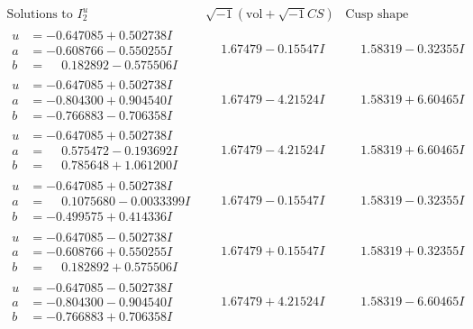 \documentclass[1p]{elsarticle_modified}
\theoremstyle{definition}
\newcommand{\I}{\sqrt{-1}}
\begin{document}
$$\begin{array}{c|c|c}  
\text{Solutions to }I^u_{2}& \I (\text{vol} + \sqrt{-1}CS) & \text{Cusp shape}\\
 \hline 
\begin{aligned}
u &= -0.647085 + 0.502738 I \\
a &= -0.608766 - 0.550255 I \\
b &= \phantom{-}0.182892 - 0.575506 I\end{aligned}
 & \phantom{-}1.67479 - 0.15547 I & \phantom{-}1.58319 - 0.32355 I \\ \hline\begin{aligned}
u &= -0.647085 + 0.502738 I \\
a &= -0.804300 + 0.904540 I \\
b &= -0.766883 - 0.706358 I\end{aligned}
 & \phantom{-}1.67479 - 4.21524 I & \phantom{-}1.58319 + 6.60465 I \\ \hline\begin{aligned}
u &= -0.647085 + 0.502738 I \\
a &= \phantom{-}0.575472 - 0.193692 I \\
b &= \phantom{-}0.785648 + 1.061200 I\end{aligned}
 & \phantom{-}1.67479 - 4.21524 I & \phantom{-}1.58319 + 6.60465 I \\ \hline\begin{aligned}
u &= -0.647085 + 0.502738 I \\
a &= \phantom{-}0.1075680 - 0.0033399 I \\
b &= -0.499575 + 0.414336 I\end{aligned}
 & \phantom{-}1.67479 - 0.15547 I & \phantom{-}1.58319 - 0.32355 I \\ \hline\begin{aligned}
u &= -0.647085 - 0.502738 I \\
a &= -0.608766 + 0.550255 I \\
b &= \phantom{-}0.182892 + 0.575506 I\end{aligned}
 & \phantom{-}1.67479 + 0.15547 I & \phantom{-}1.58319 + 0.32355 I \\ \hline\begin{aligned}
u &= -0.647085 - 0.502738 I \\
a &= -0.804300 - 0.904540 I \\
b &= -0.766883 + 0.706358 I\end{aligned}
 & \phantom{-}1.67479 + 4.21524 I & \phantom{-}1.58319 - 6.60465 I \\ \hline\begin{aligned}

\end{aligned}
\end{array}$$
\end{document}
